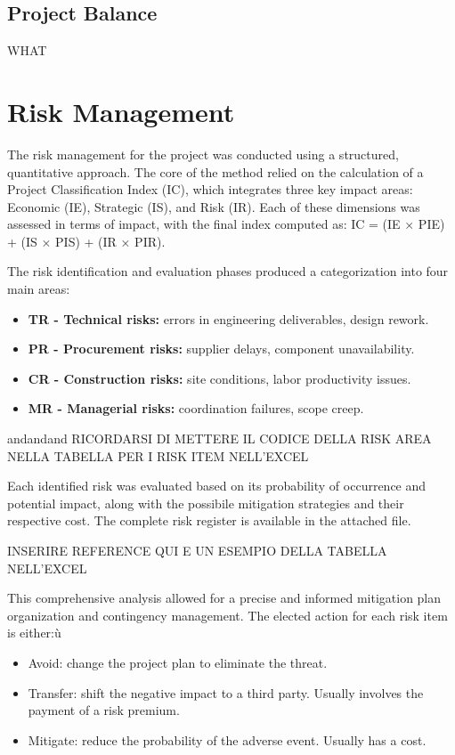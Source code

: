 \documentclass[12pt]{article}
\begin{document}
\subsection{Project Balance}
WHAT

\section{Risk Management}

The risk management for the project was conducted using a structured, quantitative approach. The core of the method relied on the calculation of a Project Classification Index (IC), which integrates three key impact areas: Economic (IE), Strategic (IS), and Risk (IR). Each of these dimensions was assessed in terms of impact, with the final index computed as:
IC = (IE × PIE) + (IS × PIS) + (IR × PIR).

The risk identification and evaluation phases produced a categorization into four main areas:
\begin{itemize}
        \item \textbf{TR - Technical risks:} errors in engineering deliverables, design rework.
        \item \textbf{PR - Procurement risks:} supplier delays, component unavailability.
        \item \textbf{CR - Construction risks:} site conditions, labor productivity issues.
        \item \textbf{MR - Managerial risks:} coordination failures, scope creep.
\end{itemize}

andandand RICORDARSI DI METTERE IL CODICE DELLA RISK AREA NELLA TABELLA PER I RISK ITEM NELL'EXCEL

Each identified risk was evaluated based on its probability of occurrence and potential impact, along with the possibile mitigation strategies and their respective cost.
The complete risk register is available in the attached file.

INSERIRE REFERENCE QUI E UN ESEMPIO DELLA TABELLA NELL'EXCEL

This comprehensive analysis allowed for a precise and informed mitigation plan organization and contingency management.
The elected action for each risk item is either:ù
\begin{itemize}
        \item Avoid: change the project plan to eliminate the threat.
        \item Transfer: shift the negative impact to a third party. Usually involves the payment of a risk premium.
        \item Mitigate: reduce the probability of the adverse event. Usually has a cost.
\end{itemize}
\end{document}
